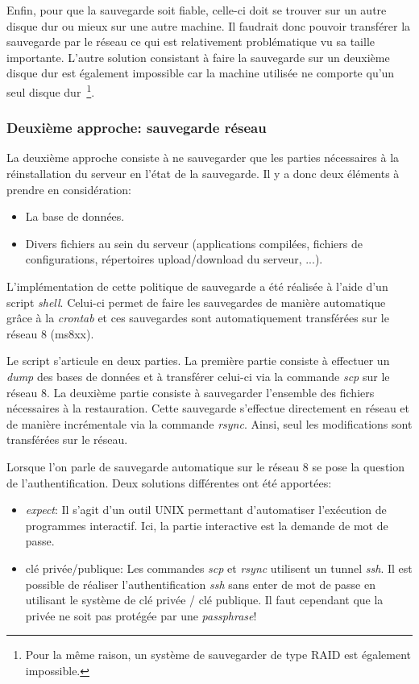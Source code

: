 \documentclass[a4paper, 11pt]{article}
\begin{document}
Enfin, pour que la sauvegarde soit fiable, celle-ci doit se trouver sur un autre disque dur ou mieux sur une autre machine. Il faudrait donc pouvoir transférer la sauvegarde par le réseau ce qui est relativement problématique vu sa taille importante. L'autre solution consistant à faire la sauvegarde sur un deuxième disque dur est également impossible car la machine utilisée ne comporte qu'un seul disque dur~\footnote{Pour la même raison, un système de sauvegarder de type RAID est également impossible.}. 

\subsubsection{Deuxième approche: sauvegarde réseau}
La deuxième approche consiste à ne sauvegarder que les parties nécessaires à la réinstallation du serveur en l'état de la sauvegarde. Il y a donc deux éléments à prendre en considération:
\begin{itemize}
\item La base de données.
\item Divers fichiers au sein du serveur (applications compilées, fichiers de configurations, répertoires upload/download du serveur, ...).
\end{itemize} 

L'implémentation de cette politique de sauvegarde a été réalisée à l'aide d'un script \textit{shell}. Celui-ci permet de faire les sauvegardes de manière automatique grâce à la \textit{crontab} et ces sauvegardes sont automatiquement transférées sur le réseau 8 (ms8xx). 

Le script s'articule en deux parties. La première partie consiste à effectuer un \textit{dump} des bases de données et à transférer celui-ci via la commande \textit{scp} sur le réseau 8. La deuxième partie consiste à sauvegarder l'ensemble des fichiers nécessaires à la restauration. Cette sauvegarde s'effectue directement en réseau et de manière incrémentale via la commande \textit{rsync}. Ainsi, seul les modifications sont transférées sur le réseau. %

Lorsque l'on parle de sauvegarde automatique sur le réseau 8 se pose la question de l'authentification. Deux solutions différentes ont été apportées:
\begin{itemize}
\item \textit{expect}: Il s'agit d'un outil UNIX permettant d'automatiser l'exécution de programmes interactif. Ici, la partie interactive est la demande de mot de passe.
\item clé privée/publique: Les commandes \textit{scp} et \textit{rsync} utilisent un tunnel \textit{ssh}. Il est possible de réaliser l'authentification \textit{ssh} sans enter de mot de passe en utilisant le système de clé privée / clé publique. Il faut cependant que la privée ne soit pas protégée par une \textit{passphrase}! 
\end{itemize}
\end{document}
